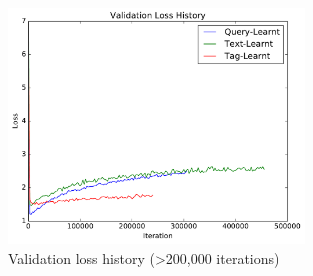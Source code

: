 \begin{figure}
    \centering
    \includegraphics[width=0.7\textwidth]{graphs/validation-loss-history}
    \caption{Validation loss history (\textgreater 200,000 iterations)}
    \label{fig:val-loss-2}
\end{figure}